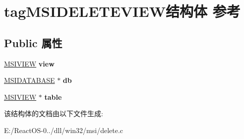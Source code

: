 \hypertarget{structtag_m_s_i_d_e_l_e_t_e_v_i_e_w}{}\section{tag\+M\+S\+I\+D\+E\+L\+E\+T\+E\+V\+I\+E\+W结构体 参考}
\label{structtag_m_s_i_d_e_l_e_t_e_v_i_e_w}
\subsection*{Public 属性}
\begin{DoxyCompactItemize}
\item 
\mbox{\label{structtag_m_s_i_d_e_l_e_t_e_v_i_e_w_ac6a010f8eb63842607fcbe5e3b2ef361}} 
\hyperlink{structtag_m_s_i_v_i_e_w}{M\+S\+I\+V\+I\+EW} {\bfseries view}
\item 
\mbox{\label{structtag_m_s_i_d_e_l_e_t_e_v_i_e_w_a5d842c94b81bb6760ab881d1c9af3f00}} 
\hyperlink{structtag_m_s_i_d_a_t_a_b_a_s_e}{M\+S\+I\+D\+A\+T\+A\+B\+A\+SE} $\ast$ {\bfseries db}
\item 
\mbox{\label{structtag_m_s_i_d_e_l_e_t_e_v_i_e_w_af95996da69e38e1270a676ac937a3781}} 
\hyperlink{structtag_m_s_i_v_i_e_w}{M\+S\+I\+V\+I\+EW} $\ast$ {\bfseries table}
\end{DoxyCompactItemize}


该结构体的文档由以下文件生成\+:\begin{DoxyCompactItemize}
\item 
E\+:/\+React\+O\+S-\/0../dll/win32/msi/delete.\+c\end{DoxyCompactItemize}
